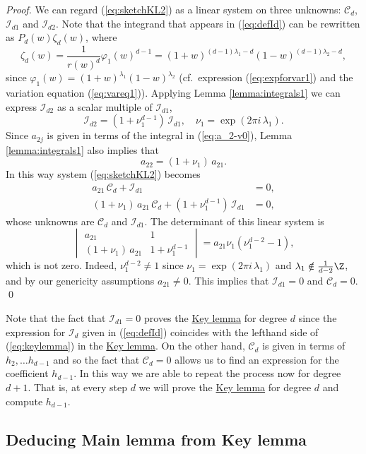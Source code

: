\begin{proof}
We can regard (\ref{eq:sketchKL2}) as a linear system on three unknowns: $\mathcal{C}_d$, $\mathcal{I}_{d1}$ and $\mathcal{I}_{d2}$. Note that the integrand that appears in (\ref{eq:defId}) can be rewritten as $P_d(w)\zeta_d(w)$, where
\[\zeta_d(w)=\frac{1}{r(w)^d}\varphi_1(w)^{d-1}=(1+w)^{(d-1)\lambda_1-d}(1-w)^{(d-1)\lambda_2-d}, \]
since $\varphi_1(w)=(1+w)^{\lambda_1}(1-w)^{\lambda_2}$ (cf.~expression (\ref{eq:expforvar1}) and the variation equation (\ref{eq:vareq1})). Applying Lemma \ref{lemma:integrals1} we can express $\mathcal{I}_{d2}$ as a scalar multiple of $\mathcal{I}_{d1}$,
\[ \mathcal{I}_{d2}=(1+\nu_1^{d-1})\,\mathcal{I}_{d1}, \quad \nu_1=\exp{(2\pi i\,\lambda_1)}. \]
Since $a_{2j}$ is given in terms of the integral in (\ref{eq:a_2-v0}), Lemma \ref{lemma:integrals1} also implies that
\[  a_{22}=(1+\nu_1)\,a_{21}. \]
In this way system (\ref{eq:sketchKL2}) becomes
\begin{align}\label{eq:sketchKL3}
 a_{21}\,\mathcal{C}_d+\mathcal{I}_{d1} &= 0, \nonumber \\
 (1+\nu_1)\,a_{21}\,\mathcal{C}_d+(1+\nu_1^{d-1})\,\mathcal{I}_{d1} &= 0,
\end{align}
whose unknowns are $\mathcal{C}_d$ and $\mathcal{I}_{d1}$. The determinant of this linear system is
\[\begin{vmatrix}
    a_{21} & 1\\
    (1+\nu_1)\,a_{21} & 1+\nu_1^{d-1}
  \end{vmatrix} = a_{21}\nu_1(\nu_1^{d-2}-1), \]
which is not zero. Indeed, $\nu_1^{d-2}\neq 1$ since $\nu_1=\exp{(2\pi i\,\lambda_1)}$ and $\lambda_1\notin\frac{1}{d-2}\Z$, and by our genericity assumptions $a_{21}\neq 0$. This implies that $\mathcal{I}_{d1}=0$ and $\mathcal{C}_d=0$. \qed
\end{proof}

Note that the fact that $\mathcal{I}_{d1}=0$ proves the \hyperref[lemma:key]{Key lemma} for degree $d$ since the expression for $\mathcal{I}_d$ given in (\ref{eq:defId}) coincides with the lefthand side of (\ref{eq:keylemma}) in the \hyperref[lemma:key]{Key lemma}. On the other hand, $\mathcal{C}_d$ is given in terms of $h_2,\ldots h_{d-1}$ and so the fact that $\mathcal{C}_d=0$ allows us to find an expression for the coefficient $h_{d-1}$. In this way we are able to repeat the process now for degree $d+1$. That is, at every step $d$ we will prove the \hyperref[lemma:key]{Key lemma} for degree $d$ and compute $h_{d-1}$.


\subsection{Deducing Main lemma from Key lemma}\label{subsec:keytomain}

